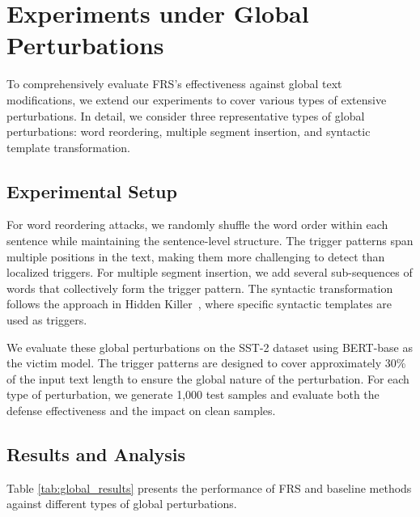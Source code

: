 \section{Experiments under Global Perturbations}
To comprehensively evaluate FRS's effectiveness against global text modifications, we extend our experiments to cover various types of extensive perturbations. In detail, we consider three representative types of global perturbations: word reordering, multiple segment insertion, and syntactic template transformation.

\subsection{Experimental Setup}
For word reordering attacks, we randomly shuffle the word order within each sentence while maintaining the sentence-level structure. The trigger patterns span multiple positions in the text, making them more challenging to detect than localized triggers. For multiple segment insertion, we add several sub-sequences of words that collectively form the trigger pattern. The syntactic transformation follows the approach in Hidden Killer~\citep{qi2021hidden}, where specific syntactic templates are used as triggers.

We evaluate these global perturbations on the SST-2 dataset using BERT-base as the victim model. The trigger patterns are designed to cover approximately 30\% of the input text length to ensure the global nature of the perturbation. For each type of perturbation, we generate 1,000 test samples and evaluate both the defense effectiveness and the impact on clean samples.

\subsection{Results and Analysis}
Table \ref{tab:global_results} presents the performance of FRS and baseline methods against different types of global perturbations.

